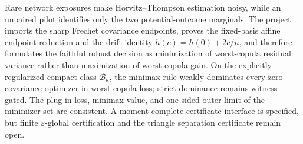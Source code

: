 Rare network exposures make Horvitz--Thompson estimation noisy, while an unpaired pilot identifies only the two potential-outcome marginals.  The project imports the sharp Frechet covariance endpoints, proves the fixed-basis affine endpoint reduction and the drift identity \(h(c)=h(0)+2c/n\), and therefore formulates the faithful robust decision as minimization of worst-copula residual variance rather than maximization of worst-copula gain.  On the explicitly regularized compact class \(\mathcal B_\kappa\), the minimax rule weakly dominates every zero-covariance optimizer in worst-copula loss; strict dominance remains witness-gated.  The plug-in loss, minimax value, and one-sided outer limit of the minimizer set are consistent.  A moment-complete certificate interface is specified, but finite \(\varepsilon\)-global certification and the triangle separation certificate remain open.